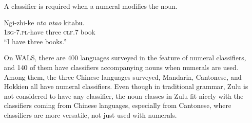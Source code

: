 \documentclass[12pt, oneside]{article}
\begin{document}
A classifier is required when a numeral modifies the noun.

\begin{exe}
\ex
\gll Ngi-zhi-ke \textit{nta} \textit{nta\textbeltl o} kitabu. \\
\textsc{1sg}-\textsc{7.pl}-have three \textsc{clf.7} book \\
\trans ``I have three books.''
\end{exe}

On WALS, there are 400 languages surveyed in the feature of numeral classifiers, and 140 of them have classifiers accompanying nouns when numerals are used. Among them, the three Chinese languages surveyed, Mandarin, Cantonese, and Hokkien all have numeral classifiers. Even though in traditional grammar, Zulu is not considered to have any classifier, the noun classes in Zulu fit nicely with the classifiers coming from Chinese languages, especially from Cantonese, where classifiers are more versatile, not just used with numerals.
\end{document}
